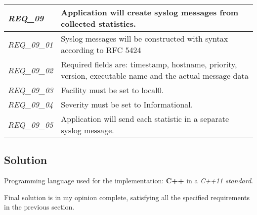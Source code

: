 \begin{table}[H]
{\begin{tabular}{@{}|l|l|@{}}
\textit{REQ\_09} & Application will create syslog messages from collected statistics. \\ \midrule
\textit{REQ\_09\_01} & Syslog messages will be constructed with syntax according to RFC 5424 \\ \midrule
\textit{REQ\_09\_02} & Required fields are: timestamp, hostname, priority, version, executable name and the actual message data \\ \midrule
\textit{REQ\_09\_03} & Facility must be set to local0. \\ \midrule
\textit{REQ\_09\_04} & Severity must be set to Informational. \\ \midrule
\textit{REQ\_09\_05} & Application will send each statistic in a separate syslog message. \\ \midrule

\end{tabular}%
}
\end{table}

\pagebreak

\subsection{Solution}

Programming language used for the implementation: \textbf{C++} in a \textit{C++11 standard}.

Final solution is in my opinion complete, satisfying all the specified requirements in the previous section.